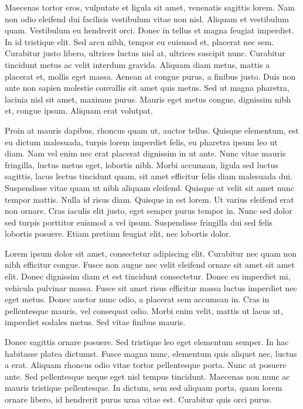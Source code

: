 Maecenas tortor eros, vulputate et ligula sit amet, venenatis sagittis lorem. Nam non odio eleifend dui facilisis vestibulum vitae non nisl. Aliquam et vestibulum quam. Vestibulum eu hendrerit orci. Donec in tellus et magna feugiat imperdiet. In id tristique elit. Sed arcu nibh, tempor eu euismod et, placerat nec sem. Curabitur justo libero, ultrices luctus nisl at, ultrices suscipit nunc. Curabitur tincidunt metus ac velit interdum gravida. Aliquam diam metus, mattis a placerat et, mollis eget massa. Aenean at congue purus, a finibus justo. Duis non ante non sapien molestie convallis sit amet quis metus. Sed ut magna pharetra, lacinia nisl sit amet, maximus purus. Mauris eget metus congue, dignissim nibh et, congue ipsum. Aliquam erat volutpat.

Proin at mauris dapibus, rhoncus quam ut, auctor tellus. Quisque elementum, est eu dictum malesuada, turpis lorem imperdiet felis, eu pharetra ipsum leo ut diam. Nam vel enim nec erat placerat dignissim in ut ante. Nunc vitae mauris fringilla, luctus metus eget, lobortis nibh. Morbi accumsan, ligula sed luctus sagittis, lacus lectus tincidunt quam, sit amet efficitur felis diam malesuada dui. Suspendisse vitae quam ut nibh aliquam eleifend. Quisque at velit sit amet nunc tempor mattis. Nulla id risus diam. Quisque in est lorem. Ut varius eleifend erat non ornare. Cras iaculis elit justo, eget semper purus tempor in. Nunc sed dolor sed turpis porttitor euismod a vel ipsum. Suspendisse fringilla dui sed felis lobortis posuere. Etiam pretium feugiat elit, nec lobortis dolor.

Lorem ipsum dolor sit amet, consectetur adipiscing elit. Curabitur nec quam non nibh efficitur congue. Fusce non augue nec velit eleifend ornare sit amet sit amet elit. Donec dignissim diam et est tincidunt consectetur. Donec eu imperdiet mi, vehicula pulvinar massa. Fusce sit amet risus efficitur massa luctus imperdiet nec eget metus. Donec auctor nunc odio, a placerat sem accumsan in. Cras in pellentesque mauris, vel consequat odio. Morbi enim velit, mattis ut lacus ut, imperdiet sodales metus. Sed vitae finibus mauris.

Donec sagittis ornare posuere. Sed tristique leo eget elementum semper. In hac habitasse platea dictumst. Fusce magna nunc, elementum quis aliquet nec, luctus a erat. Aliquam rhoncus odio vitae tortor pellentesque porta. Nunc at posuere ante. Sed pellentesque neque eget nisl tempus tincidunt. Maecenas non nunc ac mauris tristique pellentesque. In dictum, sem sed aliquam porta, quam lorem ornare libero, id hendrerit purus urna vitae est. Curabitur quis orci purus.

